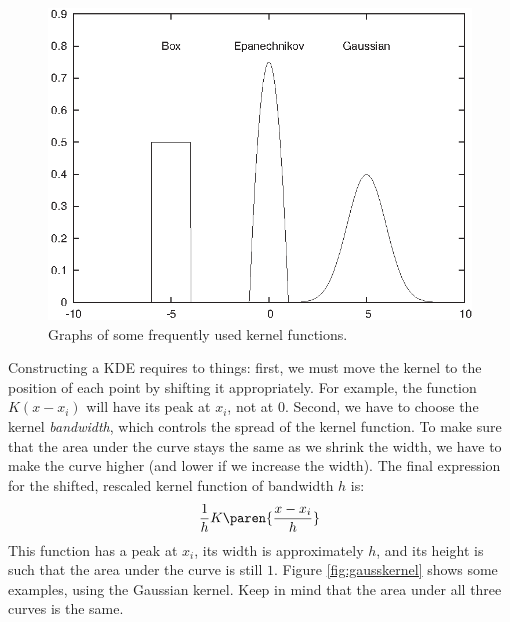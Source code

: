 \begin{figure}
  \centerline{\includegraphics{img/kernels}}
  \caption{Graphs of some frequently used kernel functions.}
  \label{fig:kernels}
\end{figure}


Constructing a KDE requires to things: first, we must move the kernel
to the position of each point by shifting it appropriately.  For
example, the function $K( x - x_i )$ will have its peak at $x_i$, not
at $0$.  Second, we have to choose the kernel \emph{bandwidth},
which controls the spread of the kernel function. To make sure that
the area under the curve stays the same as we shrink the width, we
have to make the curve higher\vadjust{\pagebreak} (and lower if we increase the width).
The final expression for the shifted, rescaled kernel function of
bandwidth $h$ is:
%
\[
\frac{1}{h} K\paren{ \frac{x-x_i}{h} }
\]
%
This function has a peak at $x_i$, its width is approximately $h$, and
its height is such that the area under the curve is still $1$.  Figure
\ref{fig:gausskernel} shows some examples, using the Gaussian kernel.
Keep in mind that the area under all three curves is the same.


